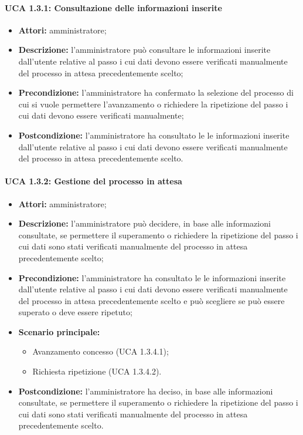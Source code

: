 \paragraph{UCA 1.3.1: Consultazione delle informazioni inserite}
\begin{itemize}
\item \textbf{Attori:} 
amministratore;
\item \textbf{Descrizione:} 
l'amministratore può consultare le informazioni inserite dall'utente relative al passo i cui dati devono essere verificati manualmente del processo in attesa precedentemente scelto; 
\item \textbf{Precondizione:} 
l'amministratore ha confermato la selezione del processo di cui si vuole permettere l'avanzamento o richiedere la ripetizione del passo i cui dati devono essere verificati manualmente;
\item \textbf{Postcondizione:} 
l'amministratore ha consultato le le informazioni inserite dall'utente relative al passo i cui dati devono essere verificati manualmente del processo in attesa precedentemente scelto.
\end{itemize}

\paragraph{UCA 1.3.2: Gestione del processo in attesa}
\begin{itemize}
\item \textbf{Attori:} 
amministratore;
\item \textbf{Descrizione:} 
l'amministratore può decidere, in base alle informazioni consultate, se permettere il superamento o richiedere la ripetizione del passo i cui dati sono stati verificati manualmente del processo in attesa precedentemente scelto;
\item \textbf{Precondizione:} 
l'amministratore ha consultato le le informazioni inserite dall'utente relative al passo i cui dati devono essere verificati manualmente del processo in attesa precedentemente scelto e può scegliere se può essere superato o deve essere ripetuto;
\item \textbf{Scenario principale:} 
\begin{itemize}
\item Avanzamento concesso (UCA 1.3.4.1);
\item Richiesta ripetizione (UCA 1.3.4.2).
\end{itemize}
\item \textbf{Postcondizione:} 
l'amministratore ha deciso, in base alle informazioni consultate, se permettere il superamento o richiedere la ripetizione del passo i cui dati sono stati verificati manualmente del processo in attesa precedentemente scelto.
\end{itemize}

